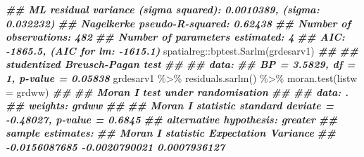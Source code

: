 \documentclass[10pt,landscape,a3paper]{article}
\newenvironment{Shaded}{\begin{snugshade}}{\end{snugshade}}
\newcommand{\AttributeTok}[1]{\textcolor[rgb]{0.77,0.63,0.00}{#1}}
\newcommand{\DocumentationTok}[1]{\textcolor[rgb]{0.56,0.35,0.01}{\textbf{\textit{#1}}}}
\newcommand{\FunctionTok}[1]{\textcolor[rgb]{0.00,0.00,0.00}{#1}}
\newcommand{\NormalTok}[1]{#1}
\newcommand{\SpecialCharTok}[1]{\textcolor[rgb]{0.00,0.00,0.00}{#1}}
\begin{document}
\begin{Shaded}
\begin{Highlighting}[]
\DocumentationTok{\#\# ML residual variance (sigma squared): 0.0010389, (sigma: 0.032232)}
\DocumentationTok{\#\# Nagelkerke pseudo{-}R{-}squared: 0.62438 }
\DocumentationTok{\#\# Number of observations: 482 }
\DocumentationTok{\#\# Number of parameters estimated: 4 }
\DocumentationTok{\#\# AIC: {-}1865.5, (AIC for lm: {-}1615.1)}
\NormalTok{spatialreg}\SpecialCharTok{::}\FunctionTok{bptest.Sarlm}\NormalTok{(grdesarv1)}
\DocumentationTok{\#\# }
\DocumentationTok{\#\#  studentized Breusch{-}Pagan test}
\DocumentationTok{\#\# }
\DocumentationTok{\#\# data:  }
\DocumentationTok{\#\# BP = 3.5829, df = 1, p{-}value = 0.05838}
\NormalTok{grdesarv1 }\SpecialCharTok{\%\textgreater{}\%}
    \FunctionTok{residuals.sarlm}\NormalTok{() }\SpecialCharTok{\%\textgreater{}\%}
    \FunctionTok{moran.test}\NormalTok{(}\AttributeTok{listw =}\NormalTok{ grdww)}
\DocumentationTok{\#\# }
\DocumentationTok{\#\#  Moran I test under randomisation}
\DocumentationTok{\#\# }
\DocumentationTok{\#\# data:  .  }
\DocumentationTok{\#\# weights: grdww    }
\DocumentationTok{\#\# }
\DocumentationTok{\#\# Moran I statistic standard deviate = {-}0.48027, p{-}value = 0.6845}
\DocumentationTok{\#\# alternative hypothesis: greater}
\DocumentationTok{\#\# sample estimates:}
\DocumentationTok{\#\# Moran I statistic       Expectation          Variance }
\DocumentationTok{\#\#     {-}0.0156087685     {-}0.0020790021      0.0007936127}


\end{Highlighting}
\end{Shaded}
\end{document}
